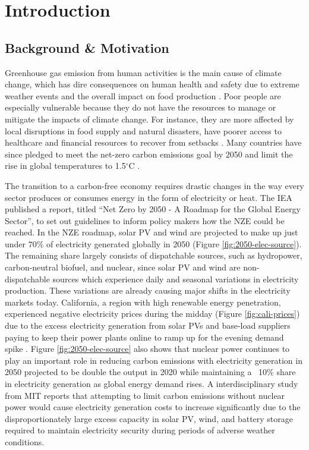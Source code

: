 \section{Introduction}

\subsection{Background \& Motivation}

Greenhouse gas emission from human activities is the main cause of climate
change, which has dire consequences on human health and safety due to extreme
weather events and the overall impact on food production
\cite{mcmichael_global_2004}. Poor people are especially vulnerable because
they do not have the resources to manage or mitigate the impacts of climate
change. For instance, they are more affected by local disruptions in food
supply and natural disasters, have poorer access to healthcare and financial
resources to recover from setbacks \cite{hallegatte_shock_2016}. Many countries
have since pledged to meet the net-zero carbon emissions goal by 2050 and limit
the rise in global temperatures to 1.5$^{\circ}$C \cite{iea_net_2021}.

The transition to a carbon-free economy requires drastic changes in the way
every sector produces or consumes energy in the form of electricity or heat.
The \gls{IEA} published a report, titled ``Net Zero by 2050 - A Roadmap for the
Global Energy Sector'', to set out guidelines to inform policy makers how the
\gls{NZE} could be reached. In the \gls{NZE} roadmap,
solar \gls{PV} and wind are projected to make up just under 70\% of
electricity generated globally in 2050 (Figure \ref{fig:2050-elec-source}).
The remaining share largely consists of dispatchable sources, such as
hydropower, carbon-neutral biofuel, and nuclear, since solar \gls{PV} and wind
are non-dispatchable sources which experience daily and seasonal variations in
electricity production. These variations are already causing major shifts in
the electricity markets today. California, a region with high renewable energy
penetration, experienced negative electricity prices during the midday (Figure
\ref{fig:cali-prices}) due to the excess electricity generation from solar
\glspl{PV} and base-load suppliers paying to keep their power plants online to
ramp up for the evening demand spike \cite{forsberg_market_2020}. Figure
\ref{fig:2050-elec-source} also shows that nuclear power continues
to play an important role in reducing carbon emissions with electricity
generation in 2050 projected to be double the output in 2020 while maintaining
a ~10\% share in electricity generation as global energy demand rises. A
interdisciplinary study from \gls{MIT} reports that attempting to limit carbon
emissions without nuclear power would cause electricity generation costs to
increase significantly due to the disproportionately large excess capacity in
solar \gls{PV}, wind, and battery storage required to maintain electricity
security during periods of adverse weather conditions.


